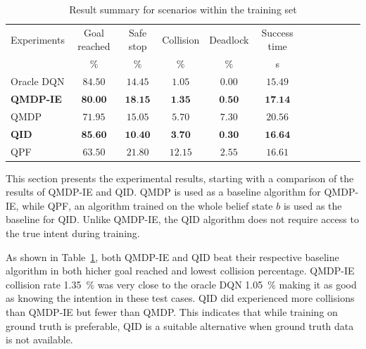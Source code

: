 \begin{table}
	\caption{Result summary for scenarios within the training set}
	\label{tab:belief_results_summary}
	\begin{tabularx}{\columnwidth}{@{}l*{10}{c}c@{}}
	\toprule
	Experiments     & Goal reached & Safe stop & Collision & Deadlock & Success time \\ 
			 & $\%$ & $\%$ & $\%$ & $\%$ & s & \\ 
	\midrule
	Oracle DQN    & $84.50$ & $14.45$ & $1.05$ & $0.00$ & $15.49$\\ %
	\textbf{QMDP-IE}   & $\textbf{80.00}$ & $\textbf{18.15}$ & $\textbf{1.35}$ & $\textbf{0.50}$ & $\textbf{17.14}$ \\ 
	QMDP      & $71.95$ & $15.05$ & $5.70$ & $7.30$ & $20.56$ \\ 
	\textbf{QID}       & $\textbf{85.60}$ & $\textbf{10.40}$ & $\textbf{3.70}$ & $\textbf{0.30}$ & $\textbf{16.64}$ \\ %
	QPF       & $63.50$ & $21.80$ & $12.15$ & $2.55$ & $16.61$ \\ %
	
	\bottomrule
	\end{tabularx}
\end{table}

This section presents the experimental results, starting with a comparison of the results of QMDP-IE and QID. QMDP is used as a baseline algorithm for QMDP-IE, while QPF, an algorithm trained on the whole belief state $b$ is used as the baseline for QID. Unlike QMDP-IE, the QID algorithm does not require access to the true intent during training.

As shown in Table~\ref{tab:belief_results_summary}, both QMDP-IE and QID beat their respective baseline algorithm in both hicher goal reached and lowest collision percentage. QMDP-IE collision rate \SI{1.35}{\percent} was very close to the oracle DQN \SI{1.05}{\percent} making it as good as knowing the intention in these test cases.  
QID did experienced more collisions than QMDP-IE but fewer than QMDP. This indicates that while training on ground truth is preferable, QID is a suitable alternative when ground truth data is not available.



